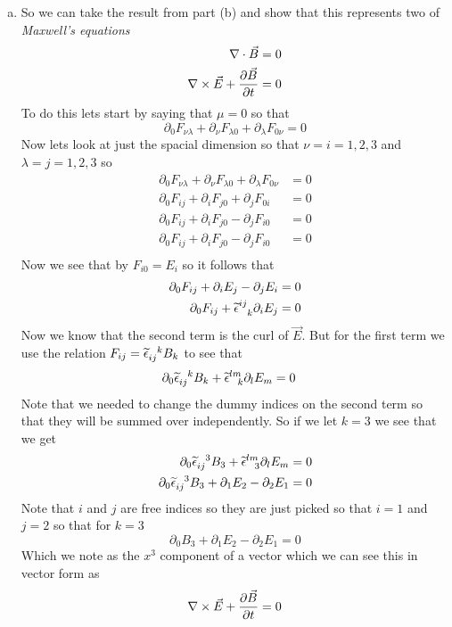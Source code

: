 \documentclass[11pt]{article}
\numberwithin{equation}{section}
\begin{document}
\begin{enumerate}[(a)]
\item
So we can take the result from part (b) and show that this represents two of \emph{Maxwell's equations}
\begin{align}
\label{max1}
\bold\nabla\cdot\vec{B} &= 0\\
\label{max2}
\bold\nabla\times\vec{E}+\frac{\partial\vec{B}}{\partial t} &=0
\end{align}
To do this lets start by saying that $\mu=0$ so that
$$\partial_{0}F_{\nu\lambda} + \partial_{\nu}F_{\lambda0} + \partial_{\lambda}F_{0\nu} =0 $$
Now lets look at just the spacial dimension so that $\nu=i=1,2,3$ and $\lambda=j=1,2,3$ so
\begin{align*}
\partial_{0}F_{\nu\lambda} + \partial_{\nu}F_{\lambda0} + \partial_{\lambda}F_{0\nu} &= 0 \\
\partial_{0}F_{ij} + \partial_{i}F_{j0} + \partial_{j}F_{0i} &= 0 \\
\partial_{0}F_{ij} + \partial_{i}F_{j0} - \partial_{j}F_{i0} &= 0 \\
\partial_{0}F_{ij} + \partial_{i}F_{j0} - \partial_{j}F_{i0} &= 0 \\
\end{align*}
Now we see that by $F_{i0} = E_i$ so it follows that
\begin{align*}
\partial_{0}F_{ij} + \partial_{i}E_{j} - \partial_{j}E_{i} &= 0 \\
\partial_{0}F_{ij} + \widetilde{\epsilon}^{ij}_{\ \ k}\partial_{i}E_{j} &= 0 
\end{align*}
Now we know that the second term is the curl of $\vec{E}$. But for the first term we use the relation $F_{ij} = \widetilde{\epsilon}_{ij}^{\ \ k}B_k$ to see that
\begin{align*}
\partial_{0}\widetilde{\epsilon}_{ij}^{\ \ k}B_k + \widetilde{\epsilon}^{lm}_{\ \ k}\partial_{l}E_{m} &= 0 
\end{align*}
Note that we needed to change the dummy indices on the second term so that they will be summed over independently. So if we let $k=3$ we see that we get
\begin{align*}
\partial_{0}\widetilde{\epsilon}_{ij}^{\ \ 3}B_3 + \widetilde{\epsilon}^{lm}_{\ \ 3}\partial_{l}E_{m} &= 0 \\
\partial_{0}\widetilde{\epsilon}_{ij}^{\ \ 3}B_3 + \partial_{1}E_{2}-\partial_{2}E_{1} &= 0 
\end{align*}
Note that $i$ and $j$ are free indices so they are just picked so that $i=1$ and $j=2$ so that for $k=3$
$$\partial_{0}B_3 + \partial_{1}E_{2}-\partial_{2}E_{1} = 0$$
Which we note as the $x^3$ component of a vector which we can see this in vector form as
$$\bold\nabla\times\vec{E}+\frac{\partial\vec{B}}{\partial t} =0$$

\end{enumerate}
\end{document}
